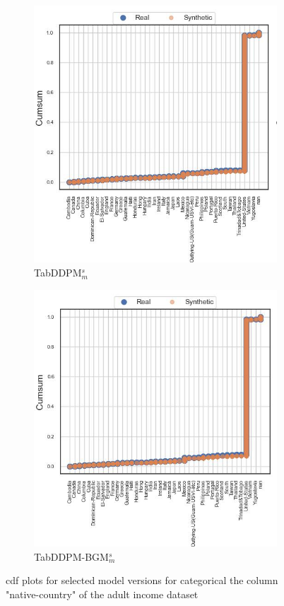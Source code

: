 \begin{figure}[H]
	\begin{subfigure}{0.3\textwidth}
		\centering
		\includegraphics[width=\textwidth]{images/cdf/tab-ddpm-simTune-minmax.jpg}
		\caption{TabDDPM$^{s}_m$}
	\end{subfigure}
	\begin{subfigure}{0.3\textwidth}
		\centering
		\includegraphics[width=\textwidth]{images/cdf/tab-ddpm-bgm-simTune-minmax.jpg}
		\caption{TabDDPM-BGM$^{s}_m$}
	\end{subfigure}
	\caption[CDF native-country]{\gls{cdf} plots for selected model versions for categorical the column "native-country" of the adult income dataset \cite{Dua:2019}}
	\label{fig:cdf}
\end{figure}

